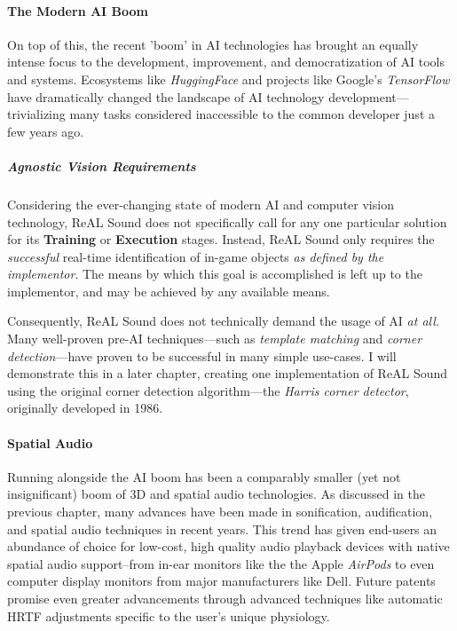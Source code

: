 \documentclass{report}
\newcommand{\rs}{ReAL Sound\xspace}
\begin{document}
\paragraph{The Modern AI Boom}

On top of this, the recent 'boom' in AI technologies\cite{Knight_2023}\cite{Meredith_2023} has brought an equally intense focus to the development, improvement, and democratization of AI tools and systems\cite{Brynjolfsson_McAfee_2017}\cite{Heikkilä_2022}. Ecosystems like \emph{HuggingFace}\cite{Wiggers_2022} and projects like Google's \emph{TensorFlow}\cite{tensorflow2015-whitepaper} have dramatically changed the landscape of AI technology development---trivializing many tasks considered inaccessible to the common developer just a few years ago.

\subparagraph{Agnostic Vision Requirements}

Considering the ever-changing state of modern AI and computer vision technology, \rs does not specifically call for any one particular solution for its \textbf{Training} or \textbf{Execution} stages. Instead, \rs only requires the \emph{successful} real-time identification of in-game objects \textit{as defined by the implementor}. The means by which this goal is accomplished is left up to the implementor, and may be achieved by any available means. 

Consequently, \rs does not technically demand the usage of AI \emph{at all.} Many well-proven pre-AI techniques---such as \emph{template matching}\cite{Brunelli2009-gh} and \emph{corner detection}\cite{Hildreth1980}---have proven to be successful in many simple use-cases. I will demonstrate this in a later chapter, creating one  implementation of \rs using the original corner detection algorithm---the \emph{Harris corner detector}\cite{Harris}, originally developed in 1986. 

\paragraph{Spatial Audio}
Running alongside the AI boom has been a comparably smaller (yet not insignificant) boom of 3D and spatial audio technologies. As discussed in the previous chapter, many advances have been made in sonification, audification, and spatial audio techniques in recent years. This trend has given end-users an abundance of choice for low-cost, high quality audio playback devices with native spatial audio support--from in-ear monitors like the the Apple \emph{AirPods}\cite{ApplePods} to even computer display monitors from major manufacturers like Dell\cite{Campbell_2025}. Future patents promise even greater advancements through advanced techniques like automatic HRTF adjustments specific to the user's unique physiology\cite{Antti2024}.
\end{document}
